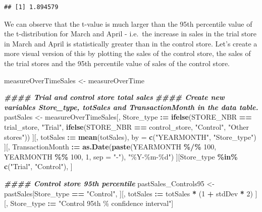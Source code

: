 \documentclass[
]{article}
\newenvironment{Shaded}{\begin{snugshade}}{\end{snugshade}}
\newcommand{\AttributeTok}[1]{\textcolor[rgb]{0.13,0.29,0.53}{#1}}
\newcommand{\DecValTok}[1]{\textcolor[rgb]{0.00,0.00,0.81}{#1}}
\newcommand{\DocumentationTok}[1]{\textcolor[rgb]{0.56,0.35,0.01}{\textbf{\textit{#1}}}}
\newcommand{\FunctionTok}[1]{\textcolor[rgb]{0.13,0.29,0.53}{\textbf{#1}}}
\newcommand{\NormalTok}[1]{#1}
\newcommand{\OtherTok}[1]{\textcolor[rgb]{0.56,0.35,0.01}{#1}}
\newcommand{\SpecialCharTok}[1]{\textcolor[rgb]{0.81,0.36,0.00}{\textbf{#1}}}
\newcommand{\StringTok}[1]{\textcolor[rgb]{0.31,0.60,0.02}{#1}}
\begin{document}
\begin{verbatim}
## [1] 1.894579
\end{verbatim}

We can observe that the t-value is much larger than the 95th percentile
value of the t-distribution for March and April - i.e.~the increase in
sales in the trial store in March and April is statistically greater
than in the control store. Let's create a more visual version of this by
plotting the sales of the control store, the sales of the trial stores
and the 95th percentile value of sales of the control store.

\begin{Shaded}
\begin{Highlighting}[]
\NormalTok{measureOverTimeSales }\OtherTok{\textless{}{-}}\NormalTok{ measureOverTime}

\DocumentationTok{\#\#\#\# Trial and control store total sales}
\DocumentationTok{\#\#\#\# Create new variables Store\_type, totSales and TransactionMonth in the data table.}
\NormalTok{pastSales }\OtherTok{\textless{}{-}}\NormalTok{ measureOverTimeSales[, Store\_type }\SpecialCharTok{:=} \FunctionTok{ifelse}\NormalTok{(STORE\_NBR }\SpecialCharTok{==}\NormalTok{ trial\_store, }\StringTok{"Trial"}\NormalTok{,}
\FunctionTok{ifelse}\NormalTok{(STORE\_NBR }\SpecialCharTok{==}\NormalTok{ control\_store, }\StringTok{"Control"}\NormalTok{, }\StringTok{"Other stores"}\NormalTok{))}
\NormalTok{][, totSales }\SpecialCharTok{:=} \FunctionTok{mean}\NormalTok{(totSales), by }\OtherTok{=} \FunctionTok{c}\NormalTok{(}\StringTok{"YEARMONTH"}\NormalTok{, }\StringTok{"Store\_type"}\NormalTok{)}
\NormalTok{][, TransactionMonth }\SpecialCharTok{:=} \FunctionTok{as.Date}\NormalTok{(}\FunctionTok{paste}\NormalTok{(YEARMONTH }\SpecialCharTok{\%/\%} \DecValTok{100}\NormalTok{, YEARMONTH }\SpecialCharTok{\%\%} \DecValTok{100}\NormalTok{, }\DecValTok{1}\NormalTok{, }\AttributeTok{sep =} \StringTok{"{-}"}\NormalTok{), }\StringTok{"\%Y{-}\%m{-}\%d"}\NormalTok{)}
\NormalTok{][Store\_type }\SpecialCharTok{\%in\%} \FunctionTok{c}\NormalTok{(}\StringTok{"Trial"}\NormalTok{, }\StringTok{"Control"}\NormalTok{), ]}

\DocumentationTok{\#\#\#\# Control store 95th percentile}
\NormalTok{pastSales\_Controls95 }\OtherTok{\textless{}{-}}\NormalTok{ pastSales[Store\_type }\SpecialCharTok{==} \StringTok{"Control"}\NormalTok{,}
\NormalTok{ ][, totSales }\SpecialCharTok{:=}\NormalTok{ totSales }\SpecialCharTok{*}\NormalTok{ (}\DecValTok{1} \SpecialCharTok{+}\NormalTok{ stdDev }\SpecialCharTok{*} \DecValTok{2}\NormalTok{)}
\NormalTok{ ][, Store\_type }\SpecialCharTok{:=} \StringTok{"Control 95th \% confidence}
\StringTok{interval"}\NormalTok{]}


\end{Highlighting}
\end{Shaded}
\end{document}
